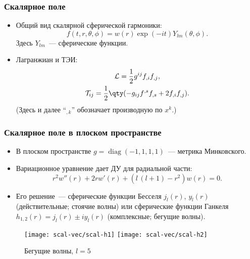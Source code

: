 \documentclass[compress, 9pt]{beamer}
\begin{document}
    \begin{frame}\frametitle{Скалярное поле}

        \begin{itemize}\justifying
            \item Общий вид скалярной сферической гармоники\nocite{Vas2018a}:
            $$f(t,r,\theta,\phi) = w(r) \exp(-i t) Y_{lm}(\theta,\phi).$$
            Здесь $Y_{lm}$~--- сферические функции.
            \item Лагранжиан и ТЭИ: \begin{gather}
                \mathcal{L} = \frac{1}{2} g^{ij} f_{,i} f_{,j}, \\
                \mathcal{T}_{ij} = \frac{1}{2} \qty(- g_{ij} f^{,s} f_{,s} + 2 f_{,i} f_{,j}).
            \end{gather}
            (Здесь и далее \enquote{${}_{,k}$} обозначает производную по $x^k$.)
        \end{itemize}

    \end{frame}

    \begin{frame}\frametitle{Скалярное поле в плоском пространстве}

        \begin{itemize}\justifying
            \item В плоском пространстве $g = \mathop{\mathrm{diag}}(-1, 1, 1, 1)$~--- метрика Минковского.
            \item Вариационное уравнение дает ДУ для радиальной части:
            \begin{equation*}
                r^2 w''(r) + 2 r w'(r) + (l\,(l+1) - r^2) w(r) = 0.
            \end{equation*}
            \item Его решение~--- сферические функции Бесселя $j_l(r)$, $y_l(r)$ (действительные; стоячие волны) или сферические функции Ганкеля $h_{1,2}(r) = j_l(r) \pm i y_l(r)$ (комплексные; бегущие волны).
        \end{itemize}
        \begin{figure}[h]
            \centering
            \texttt{[image: scal-vec/scal-h1]}\hspace{8pt}%
            \texttt{[image: scal-vec/scal-h2]}\hspace{8pt}%
            \caption[]{Бегущие волны, $l = 5$}%
        \end{figure}

    \end{frame}
\end{document}

